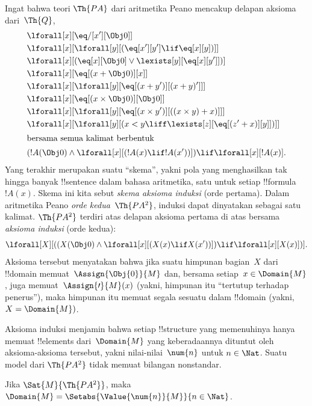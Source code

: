\documentclass[../../../include/open-logic-section]{subfiles}
\begin{document}


Ingat bahwa teori $\Th{PA}$ dari aritmetika Peano mencakup delapan aksioma
dari~$\Th{Q}$,
\begin{align*}
& \lforall[x][\eq/[x'][\Obj 0]]\\
& \lforall[x][\lforall[y][(\eq[x'][y'] \lif \eq[x][y])]]\\
& \lforall[x][(\eq[x][\Obj 0] \lor \lexists[y][\eq[x][y']])]\\ 
& \lforall[x][\eq[(x + \Obj 0)][x]]\\
& \lforall[x][\lforall[y][\eq[(x + y')][(x + y)']]]\\
& \lforall[x][\eq[(x \times \Obj 0)][\Obj 0]]\\
& \lforall[x][\lforall[y][\eq[(x \times y')][((x \times y) + x)]]]\\
& \lforall[x][\lforall[y][(x < y \liff \lexists[z][\eq[(z' + x)][y]])]]\\
\intertext{bersama semua kalimat berbentuk}
& (!A(\Obj 0) \land \lforall[x][(!A(x) \lif !A(x'))]) \lif \lforall[x][!A(x)].
\end{align*}
Yang terakhir merupakan suatu ``skema'', yakni pola yang menghasilkan tak
hingga banyak !!{sentence} dalam bahasa aritmetika, satu untuk setiap
!!{formula}~$!A(x)$. Skema ini kita sebut \emph{skema aksioma induksi}
(orde pertama).
Dalam aritmetika Peano \emph{orde kedua}~$\Th{PA^2}$, induksi dapat dinyatakan
sebagai satu kalimat. $\Th{PA^2}$ terdiri atas delapan aksioma pertama di atas
bersama \emph{aksioma induksi} (orde kedua):
\[
\lforall[X][((X(\Obj 0) \land \lforall[x][(X(x) \lif X(x'))]) \lif \lforall[x][X(x)])].
\]
Aksioma tersebut menyatakan bahwa jika suatu himpunan bagian~$X$ dari
!!{domain} memuat~$\Assign{\Obj{0}}{M}$ dan, bersama setiap~$x \in
\Domain{M}$, juga memuat~$\Assign{\prime}{M}(x)$ (yakni, himpunan itu
``tertutup terhadap penerus''), maka himpunan itu memuat segala sesuatu dalam
!!{domain} (yakni, $X = \Domain{M})$.

Aksioma induksi menjamin bahwa setiap !!{structure} yang memenuhinya hanya
memuat !!{element}s dari~$\Domain{M}$ yang keberadaannya dituntut oleh
aksioma-aksioma tersebut, yakni nilai-nilai~$\num{n}$ untuk $n \in \Nat$.
Suatu model dari $\Th{PA^2}$ tidak memuat bilangan nonstandar.

\begin{thm}
Jika $\Sat{M}{\Th{PA^2}}$, maka $\Domain{M} =
\Setabs{\Value{\num{n}}{M}}{n \in \Nat}$.
\end{thm}
\end{document}
